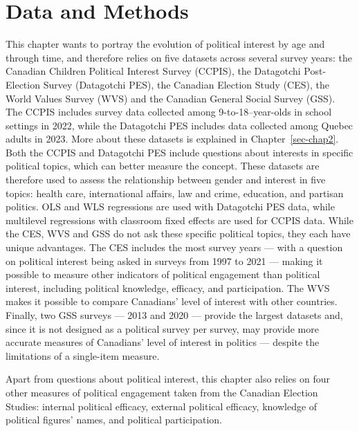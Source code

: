 \documentclass[
  letterpaper,
  DIV=11,
  numbers=noendperiod]{scrreprt}
\begin{document}
\section{Data and Methods}\label{data-and-methods}

This chapter wants to portray the evolution of political interest by age
and through time, and therefore relies on five datasets across several
survey years: the Canadian Children Political Interest Survey (CCPIS),
the Datagotchi Post-Election Survey (Datagotchi PES), the Canadian
Election Study (CES), the World Values Survey (WVS) and the Canadian
General Social Survey (GSS). The CCPIS includes survey data collected
among 9-to-18--year-olds in school settings in 2022, while the
Datagotchi PES includes data collected among Quebec adults in 2023. More
about these datasets is explained in Chapter~\ref{sec-chap2}. Both the
CCPIS and Datagotchi PES include questions about interests in specific
political topics, which can better measure the concept. These datasets
are therefore used to assess the relationship between gender and
interest in five topics: health care, international affairs, law and
crime, education, and partisan politics. OLS and WLS regressions are
used with Datagotchi PES data, while multilevel regressions with
classroom fixed effects are used for CCPIS data. While the CES, WVS and
GSS do not ask these specific political topics, they each have unique
advantages. The CES includes the most survey years --- with a question
on political interest being asked in surveys from 1997 to 2021 ---
making it possible to measure other indicators of political engagement
than political interest, including political knowledge, efficacy, and
participation. The WVS makes it possible to compare Canadians' level of
interest with other countries. Finally, two GSS surveys --- 2013 and
2020 --- provide the largest datasets and, since it is not designed as a
political survey per survey, may provide more accurate measures of
Canadians' level of interest in politics --- despite the limitations of
a single-item measure.

Apart from questions about political interest, this chapter also relies
on four other measures of political engagement taken from the Canadian
Election Studies: internal political efficacy, external political
efficacy, knowledge of political figures' names, and political
participation.
\end{document}
